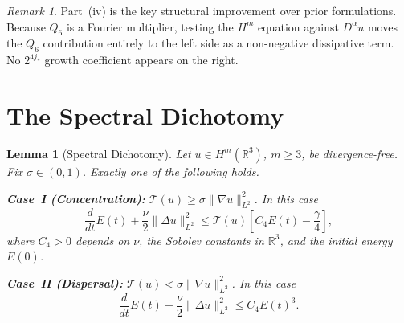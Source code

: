 \documentclass[12pt]{amsart}
\newtheorem{lemma}[theorem]{Lemma}
\theoremstyle{remark}
\newtheorem{remark}[theorem]{Remark}
\newcommand{\R}{\mathbb{R}}
\newcommand{\Tcal}{\mathcal{T}}
\newcommand{\Qsix}{Q_6}
\begin{document}
\begin{remark}
Part~(iv) is the key structural improvement over prior formulations.
Because $\Qsix$ is a Fourier multiplier, testing the $H^m$ equation
against $D^\alpha u$ moves the $\Qsix$ contribution entirely to the
left side as a non-negative dissipative term.  No $2^{4j_*}$ growth
coefficient appears on the right.
\end{remark}

\section{The Spectral Dichotomy}
\label{sec:dichotomy}

\begin{lemma}[Spectral Dichotomy]\label{lem:dichotomy}
Let $u\in H^m(\R^3)$, $m\ge 3$, be divergence-free.
Fix $\sigma\in(0,1)$.  Exactly one of the following holds.

\medskip\noindent
\textbf{Case~I (Concentration):} $\Tcal(u)\ge\sigma\|\nabla u\|_{L^2}^2$.
In this case
\begin{equation}\label{eq:caseI}
  \frac{d}{dt}E(t)+\frac{\nu}{2}\|\Delta u\|_{L^2}^2
  \le\Tcal(u)\!\left[C_4 E(t)-\frac{\gamma}{4}\right],
\end{equation}
where $C_4>0$ depends on $\nu$, the Sobolev constants in $\R^3$, and
the initial energy $E(0)$.

\medskip\noindent
\textbf{Case~II (Dispersal):} $\Tcal(u)<\sigma\|\nabla u\|_{L^2}^2$.
In this case
\begin{equation}\label{eq:caseII}
  \frac{d}{dt}E(t)+\frac{\nu}{2}\|\Delta u\|_{L^2}^2
  \le C_4 E(t)^3.
\end{equation}
\end{lemma}
\end{document}
